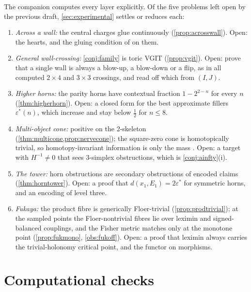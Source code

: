 \documentclass[11pt]{article}
\theoremstyle{definition}
\theoremstyle{remark}
\begin{document}
The companion \cite{Awasthi-Family} computes every layer explicitly. Of the five problems left open by the previous
draft, \cref{sec:experimental} settles or reduces each:
\begin{enumerate}[label=(\arabic*),leftmargin=*]
\item \emph{Across a wall:} the central charges glue continuously (\cref{prop:acrosswall}). Open: the hearts, and the
  gluing condition of \cite{CollinsPolishchuk2010} on them.
\item \emph{General wall-crossing:} \cref{conj:family} is toric VGIT (\cref{prop:vgit}). Open: prove that a single wall is
  always a blow-up, a blow-down or a flip, as in all computed $2\times4$ and $3\times3$ crossings, and read off which from
  $(I,J)$.
\item \emph{Higher horns:} the parity horns have contextual fraction $1-2^{2-n}$ for every $n$ (\cref{thm:higherhorn}). Open:
  a closed form for the best approximate fillers $\varepsilon^*(n)$, which increase and stay below $\frac12$ for $n\le8$.
\item \emph{Multi-object cone:} positive on the 2-skeleton (\cref{thm:multicone,prop:nervecone}); the square-zero cone is
  homotopically trivial, so homotopy-invariant information is only the mass \cite{Awasthi-Algebras}. Open: a target with
  $H^{-1}\ne0$ that sees 3-simplex obstructions, which is \cref{conj:ainfty}(i).
\item \emph{The tower:} horn obstructions are secondary obstructions of encoded claims (\cref{thm:horntower}). Open: a
  proof that $d(x_1,E_1)=2\varepsilon^*$ for symmetric horns, and an encoding of level three.
\item \emph{Fukaya:} the product fibre is generically Floer-trivial (\cref{prop:prodtrivial}); at the sampled points the
  Floer-nontrivial fibres lie over leximin and signed-balanced couplings, and the Fisher metric matches only at the
  monotone point (\cref{prop:fukmono}, \cref{obs:fukoff}). Open: a proof that leximin always carries the trivial-holonomy
  critical point, and the functor on morphisms.
\end{enumerate}

\section{Computational checks}\label{sec:code}
\end{document}
